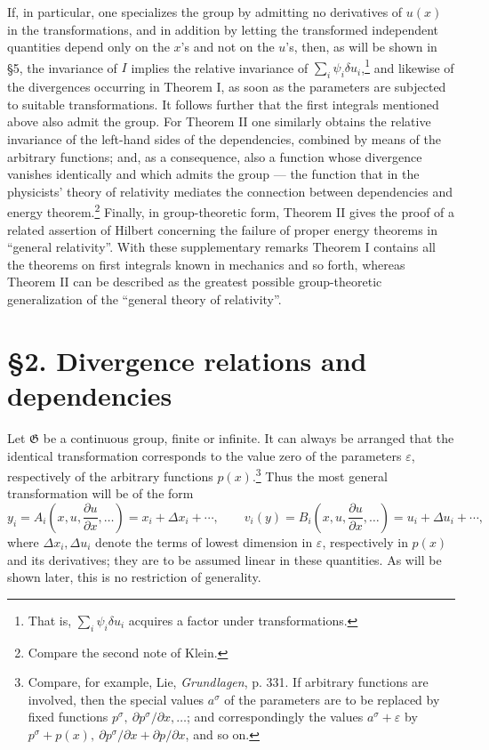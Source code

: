 \documentclass[11pt]{article}
\newcommand{\D}{\Delta}
\providecommand{\eps}{\varepsilon}
\providecommand{\G}{\mathfrak G}
\providecommand{\p}{\partial}
\begin{document}
If, in particular, one specializes the group by admitting no derivatives of \(u(x)\) in the transformations, and in addition by letting the transformed independent quantities depend only on the \(x\)'s and not on the \(u\)'s, then, as will be shown in \S{}5, the invariance of \(I\) implies the relative invariance of \(\sum_i\psi_i\delta u_i\),\footnote{That is, \(\sum_i\psi_i\delta u_i\) acquires a factor under transformations.} and likewise of the divergences occurring in Theorem I, as soon as the parameters are subjected to suitable transformations. It follows further that the first integrals mentioned above also admit the group. For Theorem II one similarly obtains the relative invariance of the left-hand sides of the dependencies, combined by means of the arbitrary functions; and, as a consequence, also a function whose divergence vanishes identically and which admits the group --- the function that in the physicists' theory of relativity mediates the connection between dependencies and energy theorem.\footnote{Compare the second note of Klein.} Finally, in group-theoretic form, Theorem II gives the proof of a related assertion of Hilbert concerning the failure of proper energy theorems in ``general relativity''. With these supplementary remarks Theorem I contains all the theorems on first integrals known in mechanics and so forth, whereas Theorem II can be described as the greatest possible group-theoretic generalization of the ``general theory of relativity''.

\section*{\S{}2. Divergence relations and dependencies}

Let \(\G\) be a continuous group, finite or infinite. It can always be arranged that the identical transformation corresponds to the value zero of the parameters \(\eps\), respectively of the arbitrary functions \(p(x)\).\footnote{Compare, for example, Lie, \emph{Grundlagen}, p. 331. If arbitrary functions are involved, then the special values \(a^\sigma\) of the parameters are to be replaced by fixed functions \(p^\sigma,\ \p p^\sigma/\p x,\ldots\); and correspondingly the values \(a^\sigma+\eps\) by \(p^\sigma+p(x),\ \p p^\sigma/\p x+\p p/\p x\), and so on.} Thus the most general transformation will be of the form
\[
y_i=A_i\!\left(x,u,\frac{\p u}{\p x},\ldots\right)=x_i+\D x_i+\cdots,\qquad
v_i(y)=B_i\!\left(x,u,\frac{\p u}{\p x},\ldots\right)=u_i+\D u_i+\cdots,
\]
where \(\D x_i,\D u_i\) denote the terms of lowest dimension in \(\eps\), respectively in \(p(x)\) and its derivatives; they are to be assumed linear in these quantities. As will be shown later, this is no restriction of generality.
\end{document}
